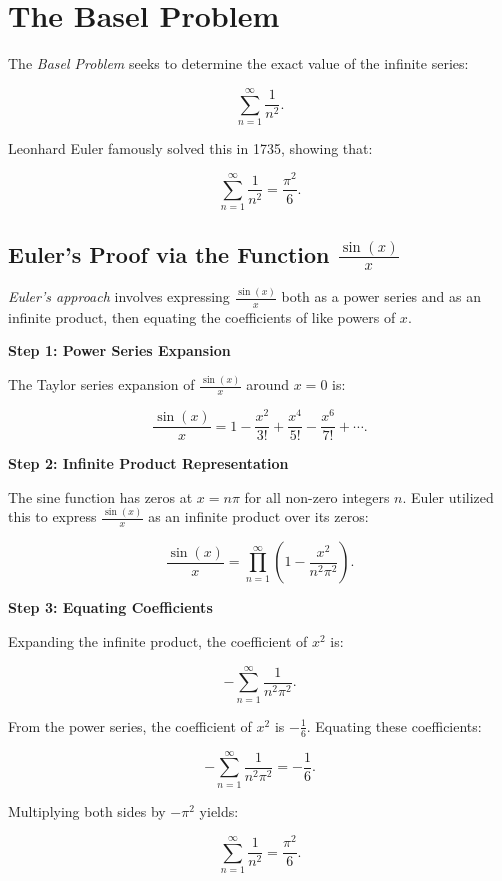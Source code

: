 \chapter{The Basel Problem}

The \emph{Basel Problem} seeks to determine the exact value of the infinite series:

\[
    \sum_{n=1}^{\infty} \frac{1}{n^2}.
\]

Leonhard Euler famously solved this in 1735, showing that:

\[
    \sum_{n=1}^{\infty} \frac{1}{n^2} = \frac{\pi^2}{6}.
\]

\section{Euler's Proof via the Function \( \frac{\sin(x)}{x} \)}

\emph{Euler's approach} involves expressing \( \frac{\sin(x)}{x} \) both as a power series and as an 
infinite product, then equating the coefficients of like powers of \(x\).

\textbf{Step 1: Power Series Expansion}

The Taylor series expansion of \( \frac{\sin(x)}{x} \) around \( x = 0 \) is:

\[
    \frac{\sin(x)}{x} = 1 - \frac{x^2}{3!} + \frac{x^4}{5!} - \frac{x^6}{7!} + \cdots.
\]

\textbf{Step 2: Infinite Product Representation}

The sine function has zeros at \( x = n\pi \) for all non-zero integers \(n\). Euler utilized this to 
express \( \frac{\sin(x)}{x} \) as an infinite product over its zeros:

\[
    \frac{\sin(x)}{x} = \prod_{n=1}^{\infty} \left(1 - \frac{x^2}{n^2\pi^2}\right).
\]

\textbf{Step 3: Equating Coefficients}

Expanding the infinite product, the coefficient of \( x^2 \) is:

\[
    -\sum_{n=1}^{\infty} \frac{1}{n^2\pi^2}.
\]

From the power series, the coefficient of \( x^2 \) is \( -\frac{1}{6} \). Equating these coefficients:

\[
    -\sum_{n=1}^{\infty} \frac{1}{n^2\pi^2} = -\frac{1}{6}.
\]

Multiplying both sides by \( -\pi^2 \) yields:

\[
    \sum_{n=1}^{\infty} \frac{1}{n^2} = \frac{\pi^2}{6}.
\]
